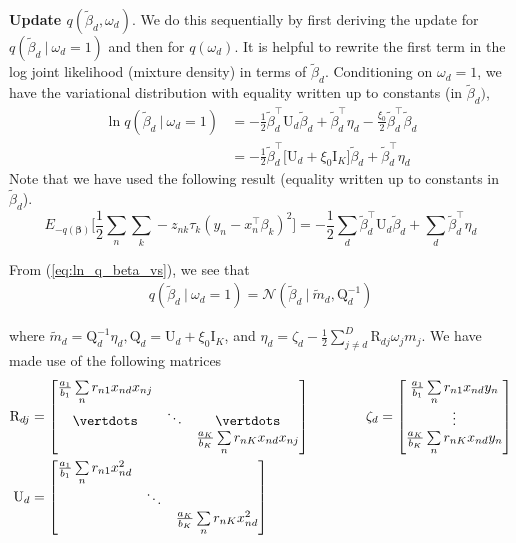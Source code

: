 \documentclass[twoside,11pt]{article}
\newcommand\given[1][]{\:#1\vert\:}
\newcommand{\transpose}[1]{#1^{\intercal}}
\newcommand{\nsum}{\sum\limits_{n}}
\newcommand{\ksum}{\sum\limits_{k}}
\newcommand{\boldbeta}{\boldsymbol\beta}
\newcommand{\betad}{\tilde{\beta}_d}
\newcommand{\umat}{\mathrm{U}}
\newcommand{\qmat}{\mathrm{Q}}
\begin{document}
\textbf{Update $q ( \betad, \omega_d )$}. We do this sequentially by first deriving the update for $q\left(\betad \given \omega_d = 1 \right)$ and then for $q\left( \omega_d \right)$. It is helpful to rewrite the first term in the log joint likelihood (mixture density) in terms of $\betad$. Conditioning on $\omega_d = 1$, we have the variational distribution with equality written up to constants (in $\betad)$, 
\begin{align}
	 \ln q\left(\betad \given \omega_d = 1 \right) &= - \frac{1}{2} \transpose{\betad} \umat_d \betad + \transpose{\betad} \eta_d - \frac{\xi_0}{2} \transpose{\betad} \betad \\
	 &= - \frac{1}{2} \transpose{\betad} \big[ \umat_d +  \xi_0 \mathrm{I}_K\big] \betad + \transpose{\betad} \eta_d \label{eq:ln_q_beta_vs}
\end{align}
Note that we have used the following result (equality written up to constants in $\betad$). 
\begin{equation}
	 E_{-q(\boldbeta)} \Bigg[ \frac{1}{2} \nsum \ksum -z_{nk} \tau_k \left( y_n - \transpose{x_n} \beta_k \right)^2 \Bigg] = - \frac{1}{2} \sum_d \transpose{\betad} \umat_d \betad + \sum_{d} \transpose{\betad} \eta_d
\end{equation}

From (\ref{eq:ln_q_beta_vs}), we see that
\begin{align*}
	q(\betad \given \omega_d = 1) = \mathcal{N} \left( \betad \given \tilde{m}_d, \qmat_d^{-1} \right)
\end{align*}

where $\tilde{m}_d = \qmat_d^{-1} \eta_d, \qmat_d = \umat_d + \xi_0 \mathrm{I}_K$, and $\eta_d = \zeta_d - \frac{1}{2} \sum\limits_{j \neq d}^D \mathrm{R}_{dj} \omega_j m_j$. We have made use of the following matrices
\begin{align*}
\mathrm{R}_{dj} & = \begin{bmatrix} 
\frac{a_1}{b_1} \nsum r_{n1} x_{nd}x_{nj}           &          &          \\ 
\vertdots   &  \ddots    & \vertdots \\
            &          & \frac{a_K}{b_K} \nsum r_{nK} x_{nd}x_{nj}        \\
\end{bmatrix} \quad \quad \quad \quad
\zeta_d =  \begin{bmatrix} 
\frac{a_1}{b_1} \nsum r_{n1} x_{nd}y_{n} \\ 
\vdots   \\
\frac{a_K}{b_K} \nsum r_{nK} x_{nd}y_{n} \\
\end{bmatrix} \\
\umat_d & = \begin{bmatrix} 
\frac{a_1}{b_1} \nsum r_{n1} x_{nd}^2            &               &  \\ 
            &  \ddots       &  \\
            &               & \frac{a_K}{b_K} \nsum r_{nK} x_{nd}^2 \\
\end{bmatrix}
\end{align*}
\end{document}
